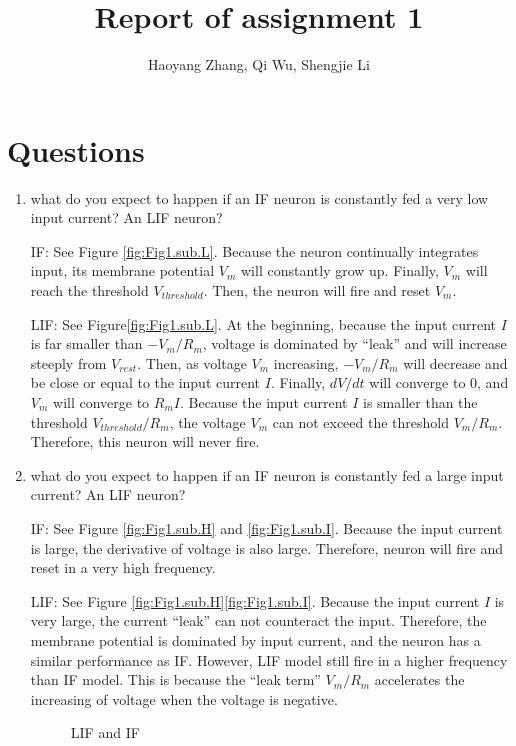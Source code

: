 \documentclass[11pt]{article}
\title{Report of assignment 1}
\author{Haoyang Zhang, Qi Wu, Shengjie Li}
\begin{document}
\maketitle

	\section*{Questions}
	\begin{enumerate}
		\item what do you expect to happen if an IF neuron is constantly fed a very low input current? An LIF neuron?
		
		IF: See Figure \ref{fig:Fig1.sub.L}. Because the neuron continually integrates input, its membrane potential $V_m$ will constantly grow up. Finally, $V_m$ will reach the threshold $V_{threshold}$. Then, the neuron will fire and reset $V_m$.
		
		LIF: See Figure\ref{fig:Fig1.sub.L}. At the beginning, because the input current $I$ is far smaller than $-V_m/R_m$, voltage is dominated by ``leak'' and will increase steeply from $V_{rest}$. Then, as voltage $V_m$ increasing, $-V_m/R_m$ will decrease and be close or equal to the input current $I$. Finally, $dV/dt$ will converge to 0, and $V_m$ will converge to $R_mI$. Because the input current $I$ is smaller than the threshold $V_{threshold}/R_m$, the voltage $V_m$ can not exceed the threshold $V_m/R_m$. Therefore, this neuron will never fire.
		
		\item what do you expect to happen if an IF neuron is constantly fed a large input current? An LIF neuron?
			
		IF: See Figure \ref{fig:Fig1.sub.H} and \ref{fig:Fig1.sub.I}. Because the input current is large, the derivative of voltage is also large. Therefore, neuron will fire and reset in a very high frequency.
		
		LIF: See Figure \ref{fig:Fig1.sub.H}\ref{fig:Fig1.sub.I}. Because the input current $I$ is very large, the current ``leak'' can not counteract the input. Therefore, the membrane potential is dominated by input current, and the neuron has a similar performance as IF. However, LIF model still fire in a higher frequency than IF model. This is because the ``leak term'' $V_m/R_m$ accelerates the increasing of voltage when the voltage is negative.
				
			\begin{figure}[htb]
			\centering
			\caption{LIF and IF}
			\end{figure}
			

\end{enumerate}
\end{document}
